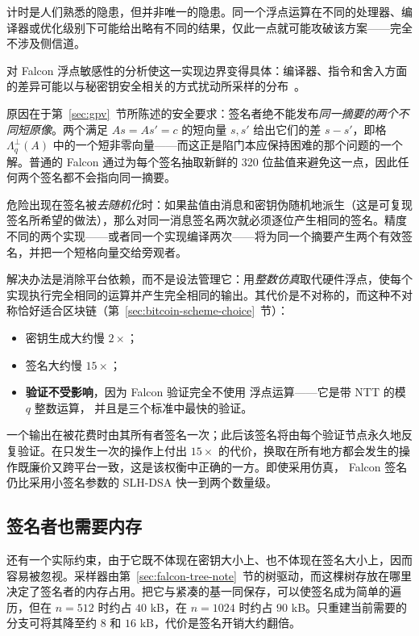计时是人们熟悉的隐患，但并非唯一的隐患。同一个浮点运算在不同的处理器、编译器或优化级别下可能给出略有不同的结果，仅此一点就可能攻破该方案——完全不涉及侧信道。

对 Falcon 浮点敏感性的分析使这一实现边界变得具体：编译器、指令和舍入方面的差异可能以与秘密钥安全相关的方式扰动所采样的分布~\cite{sleepingfalcon2025}。

原因在于第~\ref{sec:gpv}~节所陈述的安全要求：签名者绝不能发布\emph{同一摘要的两个不同短原像}。两个满足 $As = As' = c$ 的短向量 $s, s'$ 给出它们的差 $s - s'$，即格 $\Lambda^{\perp}_q(A)$ 中的一个短非零向量——而这正是陷门本应保持困难的那个问题的一个解。普通的 Falcon
通过为每个签名抽取新鲜的 320 位盐值来避免这一点，因此任何两个签名都不会指向同一摘要。

危险出现在签名被\emph{去随机化}时：如果盐值由消息和密钥伪随机地派生（这是可复现签名所希望的做法），那么对同一消息签名两次就必须逐位产生相同的签名。精度不同的两个实现——或者同一个实现编译两次——将为同一个摘要产生两个有效签名，并把一个短格向量交给旁观者。

解决办法是消除平台依赖，而不是设法管理它：用\emph{整数仿真}取代硬件浮点，使每个实现执行完全相同的运算并产生完全相同的输出。其代价是不对称的，而这种不对称恰好适合区块链（第~\ref{sec:bitcoin-scheme-choice}~节）：

\begin{itemize}
  \item 密钥生成大约慢 $2\times$；
  \item 签名大约慢 $15\times$；
  \item \textbf{验证不受影响}，因为 Falcon 验证完全不使用
        浮点运算——它是带 NTT 的模 $q$ 整数运算，
        并且是三个标准中最快的验证。
\end{itemize}

一个输出在被花费时由其所有者签名一次；此后该签名将由每个验证节点永久地反复验证。在只发生一次的操作上付出 $15\times$ 的代价，换取在所有地方都会发生的操作既廉价又跨平台一致，这是该权衡中正确的一方。即使采用仿真，
Falcon 签名仍比采用小签名参数的 SLH-DSA 快一到两个数量级。

\subsection{签名者也需要内存}

还有一个实际约束，由于它既不体现在密钥大小上、也不体现在签名大小上，因而容易被忽视。采样器由第~\ref{sec:falcon-tree-note}~节的树驱动，而这棵树存放在哪里决定了签名者的内存占用。把它与紧凑的基一同保存，可以使签名成为简单的遍历，但在 $n=512$ 时约占 $40$ kB，在
$n=1024$ 时约占 $90$ kB。只重建当前需要的分支可将其降至约 $8$ 和
$16$ kB，代价是签名开销大约翻倍。

